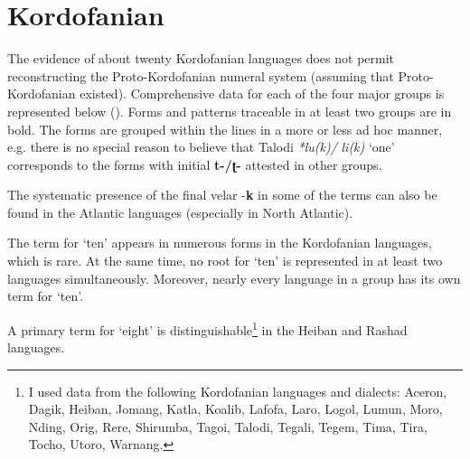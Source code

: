 \clearpage 
\section{Kordofanian}%

The evidence of about twenty Kordofanian languages does not permit reconstructing the Proto-Kordofanian numeral system (assuming that Proto-Kordofanian existed). Comprehensive data for each of the four major groups is represented below (). Forms and patterns traceable in at least two groups are in bold. The forms are grouped within the lines in a more or less ad hoc manner, e.g. there is no special reason to believe that Talodi \textit{*lu(k)/} \textit{li(k)} ‘one’ corresponds to the forms with initial \textbf{t-/ʈ-} attested in other groups.

 The systematic presence of the final velar -\textbf{k} in some of the terms can also be found in the Atlantic languages (especially in North Atlantic).

The term for ‘ten’ appears in numerous forms in the Kordofanian languages, which is rare. At the same time, no root for ‘ten’ is represented in at least two languages simultaneously. Moreover, nearly every language in a group has its own term for ‘ten’.

A primary term for ‘eight’ is distinguishable\footnote{I used data from the following Kordofanian languages and dialects: Aceron, Dagik, Heiban, Jomang, Katla, Koalib, Lafofa, Laro, Logol, Lumun, Moro, Nding, Orig, Rere, Shirumba, Tagoi, Talodi, Tegali, Tegem, Tima, Tira, Tocho, Utoro, Warnang.} in the Heiban and Rashad languages.

